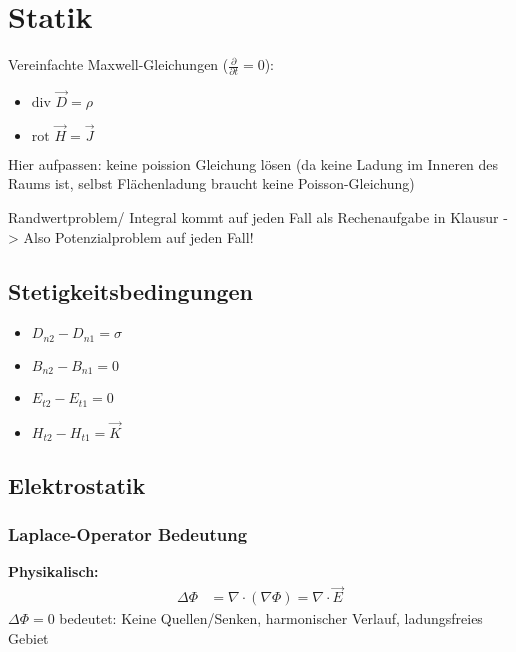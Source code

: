 \section{Statik}

Vereinfachte Maxwell-Gleichungen ($\frac{\partial}{\partial t} = 0$):
\begin{itemize}
\item $\text{div } \vec{D} = \rho$
\item $\text{rot } \vec{H} = \vec{J}$
\end{itemize}

Hier aufpassen: keine poission Gleichung lösen (da keine Ladung im Inneren des Raums ist, selbst Flächenladung braucht keine Poisson-Gleichung)

Randwertproblem/ Integral kommt auf jeden Fall als Rechenaufgabe in Klausur -> Also Potenzialproblem auf jeden Fall!

\subsection{Stetigkeitsbedingungen}

\begin{figure}[H]
\centering

\hfill

\end{figure}

\begin{itemize}
\item $D_{n2} - D_{n1} = \sigma$
\item $B_{n2} - B_{n1} = 0$
\item $E_{t2} - E_{t1} = 0$
\item $H_{t2} - H_{t1} = \vec{K}$
\end{itemize}

\subsection{Elektrostatik}

\subsubsection{Laplace-Operator Bedeutung}
\textbf{Physikalisch:}
\begin{align}
\Delta \Phi &= \nabla \cdot (\nabla \Phi) = \nabla \cdot \vec{E}
\end{align}
$\Delta \Phi = 0$ bedeutet: Keine Quellen/Senken, harmonischer Verlauf, ladungsfreies Gebiet


